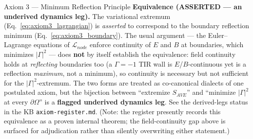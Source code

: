 \begin{resultbox}{Axiom 3 — Minimum Reflection Principle}
\medskip\noindent\textbf{Equivalence (ASSERTED --- an underived dynamics leg).} The variational extremum (Eq.~\ref{eq:axiom3_lagrangian}) is \emph{asserted} to correspond to the boundary reflection minimum (Eq.~\ref{eq:axiom3_boundary}). The usual argument --- the Euler--Lagrange equations of $\mathcal{L}_{node}$ enforce continuity of $E$ and $B$ at boundaries, which minimizes $|\Gamma|^2$ --- does \textbf{not} by itself establish the equivalence: field continuity holds at \emph{reflecting} boundaries too (a $\Gamma = -1$\gammaundeclared{} TIR wall is $E$/$B$-continuous yet is a reflection \emph{maximum}, not a minimum), so continuity is necessary but not sufficient for the $|\Gamma|^2$-extremum. The two forms are treated as co-canonical dialects of one postulated axiom, but the bijection between ``extremize $S_{AVE}$'' and ``minimize $|\Gamma|^2$ at every $\partial\Omega$'' is a \textbf{flagged underived dynamics leg}. See the derived-legs status in the KB \texttt{axiom-register.md}. (Note: the register presently records this equivalence as a proven internal theorem; the field-continuity gap above is surfaced for adjudication rather than silently overwriting either statement.)
\end{resultbox}
%
%
%
